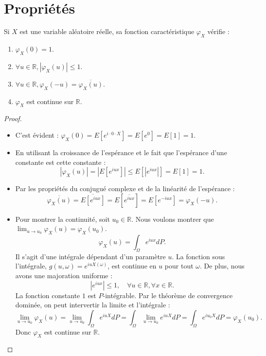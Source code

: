 \section{Propriétés}
\begin{proposition}
Si $X$ est une variable aléatoire réelle, sa fonction caractéristique $\varphi_X$ vérifie :
\begin{enumerate}
    \item[i)] $\varphi_X(0) = 1$.
    \item[ii)] $\forall u \in \mathbb{R}, |\varphi_X(u)| \le 1$.
    \item[iii)] $\forall u \in \mathbb{R}, \varphi_X(-u) = \overline{\varphi_X(u)}$.
    \item[iv)] $\varphi_X$ est continue sur $\mathbb{R}$.
\end{enumerate}
\end{proposition}
\begin{proof}
\begin{itemize}
    \item[i)] C'est évident : $\varphi_X(0) = E[e^{i \cdot 0 \cdot X}] = E[e^0] = E[1] = 1$.
    \item[ii)] En utilisant la croissance de l'espérance et le fait que l'espérance d'une constante est cette constante :
    \[ |\varphi_X(u)| = |E[e^{iux}]| \le E[|e^{iux}|] = E[1] = 1. \]
    \item[iii)] Par les propriétés du conjugué complexe et de la linéarité de l'espérance :
    \[ \overline{\varphi_X(u)} = \overline{E[e^{iux}]} = E[\overline{e^{iux}}] = E[e^{-iux}] = \varphi_X(-u). \]
    \item[iv)] Pour montrer la continuité, soit $u_0 \in \mathbb{R}$. Nous voulons montrer que $\lim_{u \to u_0} \varphi_X(u) = \varphi_X(u_0)$.
    \[ \varphi_X(u) = \int_{\Omega} e^{iux} dP. \]
    Il s'agit d'une intégrale dépendant d'un paramètre $u$. La fonction sous l'intégrale, $g(u, \omega) = e^{iuX(\omega)}$, est continue en $u$ pour tout $\omega$. De plus, nous avons une majoration uniforme :
    \[ |e^{iux}| \le 1, \quad \forall u \in \mathbb{R}, \forall x \in \mathbb{R}. \]
    La fonction constante $1$ est $P$-intégrable. Par le théorème de convergence dominée, on peut intervertir la limite et l'intégrale :
    \[ \lim_{u \to u_0} \varphi_X(u) = \lim_{u \to u_0} \int_{\Omega} e^{iuX} dP = \int_{\Omega} \lim_{u \to u_0} e^{iuX} dP = \int_{\Omega} e^{iu_0X} dP = \varphi_X(u_0). \]
    Donc $\varphi_X$ est continue sur $\mathbb{R}$.
\end{itemize}
\end{proof}
